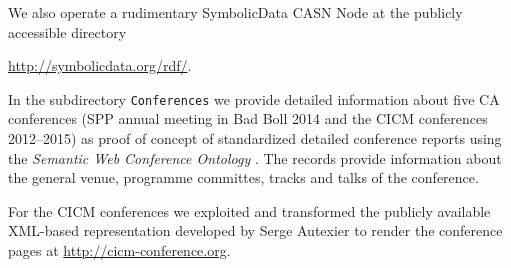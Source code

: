 \documentclass{llncs}
\newcommand{\SD}{{\sc Symbo\-lic\-Data}}
\begin{document}
We also operate a rudimentary {\SD} CASN Node at the publicly accessible
directory
\begin{center}
  \url{http://symbolicdata.org/rdf/}.
\end{center}
In the subdirectory \texttt{Conferences} we provide detailed information about
five CA conferences (SPP annual meeting in Bad Boll 2014 and the CICM
conferences 2012--2015) as proof of concept of standardized detailed
conference reports using the \emph{Semantic Web Conference Ontology}
\cite{swc}.  The records provide information about the general venue,
programme committes, tracks and talks of the conference.  

For the CICM conferences we exploited and transformed the publicly available
XML-based representation developed by Serge Autexier to render the conference
pages at \url{http://cicm-conference.org}. 
\end{document}
